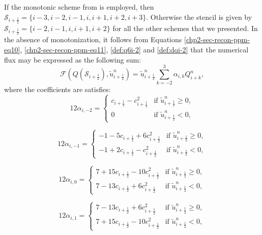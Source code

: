 If the monotonic scheme from \citet{lin:2004} is employed, then $\mathcal{S}_{i+\frac{1}{2}} = \{i-3,i-2,i-1,i,i+1,i+2,i+3\}$.
Otherwise the stencil is given by $\mathcal{S}_{i+\frac{1}{2}} = \{i-2,i-1,i,i+1,i+2\}$ for all the other schemes that we presented.
In the absence of monotonization, it follows from Equations
\eqref{chp2-sec-recon-ppm-eq10}, \eqref{chp2-sec-recon-ppm-eq11},
\eqref{def:q6i-2} and \eqref{def:dqi-2}
that the numerical flux may be expressed as the following sum:
\begin{equation*}
	\label{chp-sec-flux:numerical-flux-stencil}
	\mathcal{F}(Q(\mathcal{S}_{i+\frac{1}{2}}),\tilde{u}_{i+\frac{1}{2}}^n) = \tilde{u}_{i+\frac{1}{2}}^n
	\sum_{k=-2}^{3} \alpha_{i,k}Q_{i+k}^n,
\end{equation*}
where the coefficients are satisfies:
\begin{equation*}
	12\alpha_{i,-2} =  
    	\begin{cases}
		c_{i+\frac{1}{2}}-c_{i+\frac{1}{2}}^2 &
		\text{if } \tilde{u}_{i+\frac{1}{2}}^n \geq 0,\\
		0 & \text{if } \tilde{u}_{i+\frac{1}{2}}^n<0,
    	\end{cases}
\end{equation*}

\begin{equation*}
	12\alpha_{i,-1} =  
    	\begin{cases}
		-1 - 5c_{i+\frac{1}{2}}  + 6c_{i+\frac{1}{2}}^2 
		& \text{if } \tilde{u}_{i+\frac{1}{2}}^n \geq 0,\\
		-1 +  2c_{i+\frac{1}{2}}   -   c_{i+\frac{1}{2}}^2 & \text{if } \tilde{u}_{i+\frac{1}{2}}^n<0,
    	\end{cases}
\end{equation*}

\begin{equation*}
	12\alpha_{i,0} =  
    	\begin{cases}
		7 + 15c_{i+\frac{1}{2}} - 10c_{i+\frac{1}{2}}^2 
		& \text{if } \tilde{u}_{i+\frac{1}{2}}^n \geq 0,\\
		7 - 13c_{i+\frac{1}{2}}  +  6c_{i+\frac{1}{2}}^2 & \text{if } \tilde{u}_{i+\frac{1}{2}}^n<0,
    	\end{cases}
\end{equation*}

\begin{equation*}
	12\alpha_{i,1} =  
    	\begin{cases}
		7 - 13c_{i+\frac{1}{2}} +  6c_{i+\frac{1}{2}}^2 & \text{if } \tilde{u}_{i+\frac{1}{2}}^n \geq 0,\\
		7 + 15c_{i+\frac{1}{2}} - 10c_{i+\frac{1}{2}}^2 & \text{if } \tilde{u}_{i+\frac{1}{2}}^n<0,
    	\end{cases}
\end{equation*}

